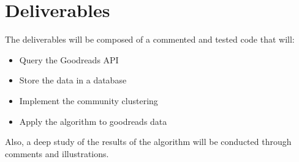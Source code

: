 \documentclass[12pt]{article}
\begin{document}
\section{Deliverables}

The deliverables will be composed of a commented and tested code that will:
\begin{itemize}
\item Query the Goodreads API
\item Store the data in a database
\item Implement the community clustering
\item Apply the algorithm to goodreads data
\end{itemize}

Also, a deep study of the results of the algorithm will be conducted through comments and illustrations.



\end{document}
